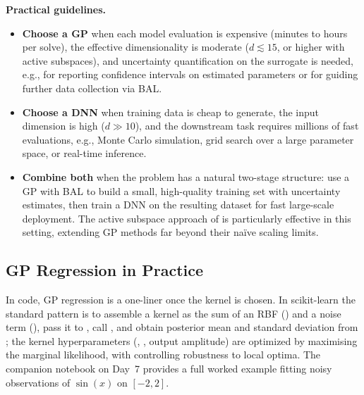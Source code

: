 \documentclass[11pt,a4paper]{report}
\begin{document}
\medskip\noindent\textbf{Practical guidelines.}
\begin{itemize}[itemsep=2pt]
\item \textbf{Choose a GP} when each model evaluation is expensive (minutes to hours per solve), the effective dimensionality is moderate ($d \lesssim 15$, or higher with active subspaces), and uncertainty quantification on the surrogate is needed, e.g., for reporting confidence intervals on estimated parameters or for guiding further data collection via BAL.
\item \textbf{Choose a DNN} when training data is cheap to generate, the input dimension is high ($d \gg 10$), and the downstream task requires millions of fast evaluations, e.g., Monte Carlo simulation, grid search over a large parameter space, or real-time inference.
\item \textbf{Combine both} when the problem has a natural two-stage structure: use a GP with BAL to build a small, high-quality training set with uncertainty estimates, then train a DNN on the resulting dataset for fast large-scale deployment.  The active subspace approach of \citet{SCHEIDEGGER201968} is particularly effective in this setting, extending GP methods far beyond their na\"ive scaling limits.
\end{itemize}

\subsection{GP Regression in Practice}

In code, GP regression is a one-liner once the kernel is chosen.  In scikit-learn the standard pattern is to assemble a kernel as the sum of an RBF () and a noise term (), pass it to , call , and obtain posterior mean and standard deviation from ; the kernel hyperparameters (, , output amplitude) are optimized by maximising the marginal likelihood, with  controlling robustness to local optima.  The companion notebook on Day~7 provides a full worked example fitting noisy observations of $\sin(x)$ on $[-2,2]$.
\end{document}
